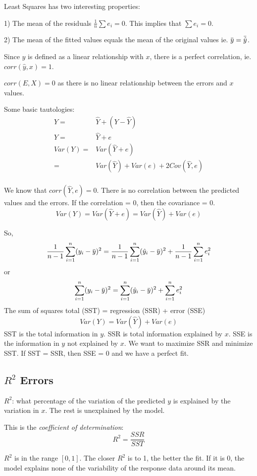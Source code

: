 \documentclass[11pt, oneside]{article}   	%
\newcommand{\overbar}[1]{\mkern 1.5mu\overline{\mkern-1.5mu#1\mkern-1.5mu}\mkern 1.5mu}
\begin{document}
Least Squares has two interesting properties:

1) The mean of the residuals $\frac{1}{n} \sum e_i = 0$. This implies that $\sum e_i = 0$.

2) The mean of the fitted values equals the mean of the original values ie. $\overbar{y} = \overbar{\hat{y}}$.

Since $\hat{y}$ is defined as a linear relationship with $x$, there is a perfect correlation, ie. $corr(\hat{y}, x) = 1$.

$corr(E, X) = 0$ as there is no linear relationship between the errors and $x$ values.

Some basic tautologies:
\begin{align*}
Y =& \hat{Y} + (Y - \hat{Y})\\
Y =& \hat{Y} + e\\
Var(Y) =& Var(\hat{Y} + e) \\
  =& Var(\hat{Y}) + Var(e) + 2Cov(\hat{Y},e)\\
\end{align*}

We know that $corr(\hat{Y}, e) = 0$. There is no correlation between the predicted values and the errors. If the correlation = 0, then the covariance = 0.
\[
Var(Y) = Var(\hat{Y} + e)  = Var(\hat{Y}) + Var(e) 
\]

So,
\[
\frac{1}{n-1} \sum\limits_{i=1}^n (y_i - \overbar{y})^2 = \frac{1}{n-1} \sum\limits_{i=1}^n (\hat{y}_i - \overbar{y})^2 + \frac{1}{n-1} \sum\limits_{i=1}^n e_i^2
\]
or
\[
 \sum\limits_{i=1}^n (y_i - \overbar{y})^2 = \sum\limits_{i=1}^n (\hat{y}_i - \overbar{y})^2 +  \sum\limits_{i=1}^n e_i^2
\]
The sum of squares total (SST) = regression (SSR) + error (SSE)
\[
Var(Y) = Var(\hat{Y}) + Var(e)
\]
SST is the total information in $y$. SSR is total information explained by $x$. SSE is the information in $y$ not explained by $x$. We want to maximize SSR and minimize SST. If SST = SSR, then SSE = 0 and we have a perfect fit.

\subsection{$R^2$ Errors}

$R^2$: what percentage of the variation of the predicted $y$  is explained by the variation in $x$. The rest is unexplained by the model.

This is the \textit{coefficient of determination}:
\[
R^2 = \frac{SSR}{SST}
\]

$R^2$ is in the range $[0,1]$. The closer $R^2$ is to 1, the better the fit. If it is 0, the model explains none of the variability of the response data around its mean.
\end{document}
